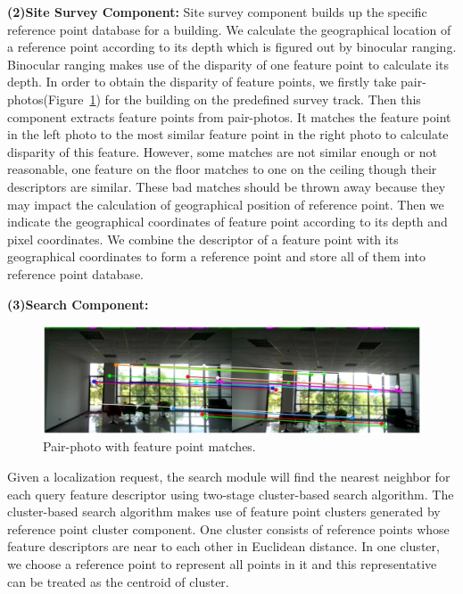 \textbf{(2)Site Survey Component:}
Site survey component builds up the specific reference point database for a building. We calculate the geographical location of a reference point according to its depth which is figured out by binocular ranging. Binocular ranging makes use of the disparity of one feature point to calculate its depth. In order to obtain the disparity of feature points, we firstly take pair-photos(Figure~\ref{pair}) for the building on the predefined survey track. Then this component extracts feature points from pair-photos. It matches the feature point in the left photo to the most similar feature point in the right photo to calculate disparity of this feature. However, some matches are not similar enough or not reasonable, \eg one feature on the floor matches to one on the ceiling though their descriptors are similar. These bad matches should be thrown away because they may impact the calculation of geographical position of reference point. Then we indicate the geographical coordinates of feature point according to its depth and pixel coordinates. We combine the descriptor of a feature point with its geographical coordinates to form a reference point and store all of them into reference point database.

\textbf{(3)Search Component:}
\begin{figure}[t!]
\centering
\includegraphics[width=1\linewidth, clip,keepaspectratio]{pair_photo.eps}
\caption{Pair-photo with feature point matches.}\label{pair}
\end{figure}
Given a localization request, the search module will find the nearest neighbor for each query feature descriptor using two-stage cluster-based search algorithm. The cluster-based search algorithm makes use of feature point clusters generated by reference point cluster component. One cluster consists of reference points whose feature descriptors are near to each other in Euclidean distance. In one cluster, we choose a reference point to represent all points in it and this representative can be treated as the centroid of cluster.

